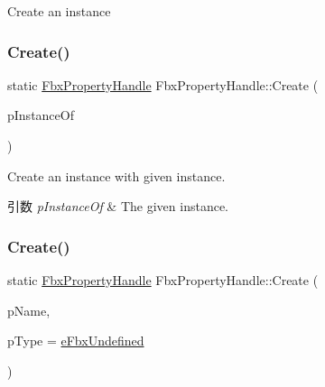 Create an instance 

\mbox{\label{class_fbx_property_handle_a0bd5893a117b68102c6ce852c6910859}} 
\subsubsection{\texorpdfstring{Create()}{Create()}\hspace{0.1cm}{\footnotesize\ttfamily [2/4]}}
{\footnotesize\ttfamily static \hyperlink{class_fbx_property_handle}{Fbx\+Property\+Handle} Fbx\+Property\+Handle\+::\+Create (\begin{DoxyParamCaption}\item[{const \hyperlink{class_fbx_property_handle}{Fbx\+Property\+Handle} \&}]{p\+Instance\+Of }\end{DoxyParamCaption})\hspace{0.3cm}{\ttfamily [static]}}

Create an instance with given instance. 
\begin{DoxyParams}{引数}
{\em p\+Instance\+Of} & The given instance. \\
\hline
\end{DoxyParams}
\mbox{\label{class_fbx_property_handle_abaec4c3b07728510a42c9205fcdb2f53}} 
\subsubsection{\texorpdfstring{Create()}{Create()}\hspace{0.1cm}{\footnotesize\ttfamily [3/4]}}
{\footnotesize\ttfamily static \hyperlink{class_fbx_property_handle}{Fbx\+Property\+Handle} Fbx\+Property\+Handle\+::\+Create (\begin{DoxyParamCaption}\item[{const char $\ast$}]{p\+Name,  }\item[{\hyperlink{fbxpropertytypes_8h_a73913a5ddfb20e57c6f25e9e6784bd92}{E\+Fbx\+Type}}]{p\+Type = {\ttfamily \hyperlink{fbxpropertytypes_8h_a73913a5ddfb20e57c6f25e9e6784bd92a150b400dddd0f8b5c7e22a1bba0721d8}{e\+Fbx\+Undefined}} }\end{DoxyParamCaption})\hspace{0.3cm}{\ttfamily [static]}}

